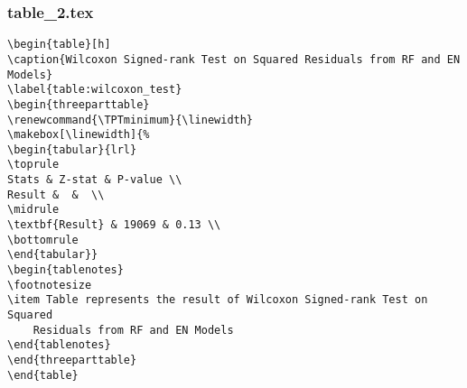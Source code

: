 \documentclass[11pt]{article}
\begin{document}
\subsubsection*{table\_2.tex}

\begin{Verbatim}[tabsize=4]
\begin{table}[h]
\caption{Wilcoxon Signed-rank Test on Squared Residuals from RF and EN Models}
\label{table:wilcoxon_test}
\begin{threeparttable}
\renewcommand{\TPTminimum}{\linewidth}
\makebox[\linewidth]{%
\begin{tabular}{lrl}
\toprule
Stats & Z-stat & P-value \\
Result &  &  \\
\midrule
\textbf{Result} & 19069 & 0.13 \\
\bottomrule
\end{tabular}}
\begin{tablenotes}
\footnotesize
\item Table represents the result of Wilcoxon Signed-rank Test on Squared
	Residuals from RF and EN Models
\end{tablenotes}
\end{threeparttable}
\end{table}

\end{Verbatim}
\end{document}
